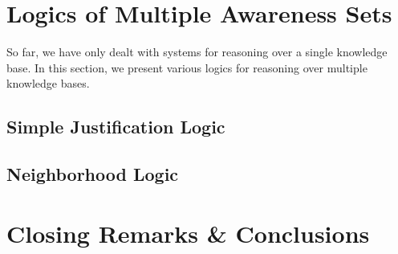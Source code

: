 \documentclass[smallextended]{svjour3}
\begin{document}
\section{Logics of Multiple Awareness Sets}

So far, we have only dealt with systems for reasoning over a single knowledge
base.  In this section, we present various logics for reasoning over multiple
knowledge bases.

\subsection{Simple Justification Logic}
\label{simple_justification}


% 

\subsection{Neighborhood Logic}
\label{neighborhood_semantics}


% 

\section{Closing Remarks \& Conclusions}
\label{conclusions}




\end{document}
